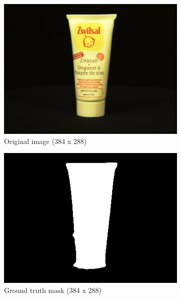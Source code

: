 \documentclass{article}
\begin{document}
\begin{figure}[h!]
  \centering
  \begin{subfigure}{0.23\textwidth}
    \centering
    \includegraphics[width=\textwidth]{images/moisturiserpng.png}
    \caption{Original image (384 x 288)}
    \label{moistpng}
  \end{subfigure}
  \hfill
  \begin{subfigure}{0.23\textwidth}
    \centering
    \includegraphics[width=\textwidth]{images/moisturisermask.png}
    \caption{Ground truth mask (384 x 288)}
    \label{moistmask}
  \end{subfigure}
  \hfill
  \begin{subfigure}{0.23\textwidth}
    \centering

\end{subfigure}
\end{figure}
\end{document}
